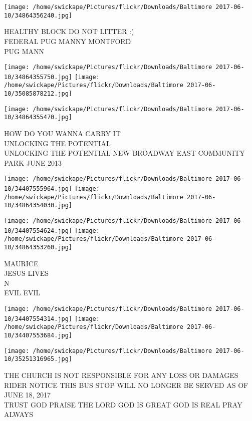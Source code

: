 \documentclass[10pt,letterpaper]{article}
\begin{document}
\vspace{0.25in}
\texttt{[image: /home/swickape/Pictures/flickr/Downloads/Baltimore 2017-06-10/34864356240.jpg]}

HEALTHY BLOCK DO NOT LITTER :)\\
FEDERAL PUG MANNY MONTFORD\\
PUG MANN\\
\pagebreak

\texttt{[image: /home/swickape/Pictures/flickr/Downloads/Baltimore 2017-06-10/34864355750.jpg]}
\texttt{[image: /home/swickape/Pictures/flickr/Downloads/Baltimore 2017-06-10/35085878212.jpg]}

\vspace{0.25in}
\texttt{[image: /home/swickape/Pictures/flickr/Downloads/Baltimore 2017-06-10/34864355470.jpg]}

HOW DO YOU WANNA CARRY IT\\
UNLOCKING THE POTENTIAL\\
UNLOCKING THE POTENTIAL NEW BROADWAY EAST COMMUNITY PARK JUNE 2013\\
\pagebreak

\texttt{[image: /home/swickape/Pictures/flickr/Downloads/Baltimore 2017-06-10/34407555964.jpg]}
\texttt{[image: /home/swickape/Pictures/flickr/Downloads/Baltimore 2017-06-10/34864354030.jpg]}

\texttt{[image: /home/swickape/Pictures/flickr/Downloads/Baltimore 2017-06-10/34407554624.jpg]}
\texttt{[image: /home/swickape/Pictures/flickr/Downloads/Baltimore 2017-06-10/34864353260.jpg]}

MAURICE\\
JESUS LIVES\\
N\\
EVIL EVIL\\
\pagebreak

\texttt{[image: /home/swickape/Pictures/flickr/Downloads/Baltimore 2017-06-10/34407554314.jpg]}
\texttt{[image: /home/swickape/Pictures/flickr/Downloads/Baltimore 2017-06-10/34407553684.jpg]}

\vspace{0.25in}
\texttt{[image: /home/swickape/Pictures/flickr/Downloads/Baltimore 2017-06-10/35251316965.jpg]}

THE CHURCH IS NOT RESPONSIBLE FOR ANY LOSS OR DAMAGES\\
RIDER NOTICE THIS BUS STOP WILL NO LONGER BE SERVED AS OF JUNE 18, 2017\\
TRUST GOD PRAISE THE LORD GOD IS GREAT GOD IS REAL PRAY ALWAYS\\
\pagebreak
\end{document}
